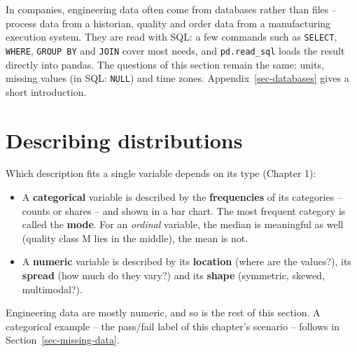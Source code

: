 \documentclass[
  letterpaper,
  DIV=11,
  numbers=noendperiod]{scrreprt}
\providecommand{\tightlist}{%
  \setlength{\itemsep}{0pt}\setlength{\parskip}{0pt}}\usepackage{longtable,booktabs,array}
\begin{document}
\begin{tcolorbox}[enhanced jigsaw, left=2mm, title=\textcolor{quarto-callout-tip-color}{\faLightbulb}\hspace{0.5em}{Engineering practice: data from databases}, opacityback=0, breakable, rightrule=.15mm, arc=.35mm, toptitle=1mm, colbacktitle=quarto-callout-tip-color!10!white, opacitybacktitle=0.6, coltitle=black, colframe=quarto-callout-tip-color-frame, bottomrule=.15mm, leftrule=.75mm, bottomtitle=1mm, titlerule=0mm, toprule=.15mm, colback=white]

In companies, engineering data often come from databases rather than
files -- process data from a historian, quality and order data from a
manufacturing execution system. They are read with SQL: a few commands
such as \texttt{SELECT}, \texttt{WHERE}, \texttt{GROUP\ BY} and
\texttt{JOIN} cover most needs, and \texttt{pd.read\_sql} loads the
result directly into pandas. The questions of this section remain the
same: units, missing values (in SQL: \texttt{NULL}) and time zones.
Appendix~\ref{sec-databases} gives a short introduction.

\end{tcolorbox}

\section{Describing distributions}\label{sec-distributions}

Which description fits a single variable depends on its type (Chapter
1):

\begin{itemize}
\tightlist
\item
  A \textbf{categorical} variable is described by the
  \textbf{frequencies} of its categories -- counts or shares -- and
  shown in a bar chart. The most frequent category is called the
  \textbf{mode}. For an \emph{ordinal} variable, the median is
  meaningful as well (quality class M lies in the middle), the mean is
  not.
\item
  A \textbf{numeric} variable is described by its \textbf{location}
  (where are the values?), its \textbf{spread} (how much do they vary?)
  and its \textbf{shape} (symmetric, skewed, multimodal?).
\end{itemize}

Engineering data are mostly numeric, and so is the rest of this section.
A categorical example -- the pass/fail label of this chapter's scenario
-- follows in Section~\ref{sec-missing-data}.
\end{document}
